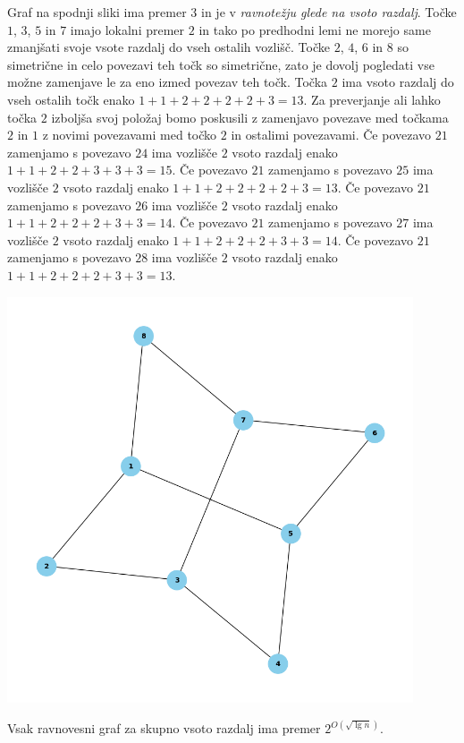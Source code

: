 \documentclass[fin1, tisk]{fmfdelo}
\begin{document}
\begin{dokaz}
Graf na spodnji sliki ima premer $3$ in je v \textit{ravnotežju glede na vsoto razdalj}.
Točke $1$, $3$, $5$ in $7$ imajo lokalni premer $2$ in tako po predhodni lemi ne
morejo same zmanjšati svoje vsote razdalj do vseh ostalih vozlišč. Točke $2$, $4$,
$6$ in $8$ so simetrične in celo povezavi teh točk so simetrične, zato je dovolj
pogledati vse možne zamenjave le za eno izmed povezav teh točk. Točka $2$ ima
vsoto razdalj do vseh ostalih točk enako $1 + 1 + 2 + 2 + 2 + 2 + 3 = 13$. Za
preverjanje ali lahko točka $2$ izboljša svoj položaj bomo poskusili z zamenjavo
povezave med točkama $2$ in $1$ z novimi povezavami med točko $2$ in ostalimi povezavami.
Če povezavo $21$ zamenjamo s povezavo $24$ ima vozlišče $2$ vsoto razdalj enako
$1 + 1 + 2 + 2 + 3 + 3 + 3 = 15$. Če povezavo $21$ zamenjamo s povezavo $25$ ima
vozlišče $2$ vsoto razdalj enako $1 + 1 + 2 + 2 + 2 + 2 + 3 = 13$. Če povezavo $21$
zamenjamo s povezavo $26$ ima vozlišče $2$ vsoto razdalj enako
$1 + 1 + 2 + 2 + 2 + 3 + 3 = 14$. Če povezavo $21$ zamenjamo s povezavo $27$ ima
vozlišče $2$ vsoto razdalj enako $1 + 1 + 2 + 2 + 2 + 3 + 3 = 14$. Če povezavo $21$
zamenjamo s povezavo $28$ ima vozlišče $2$ vsoto razdalj enako
$1 + 1 + 2 + 2 + 2 + 3 + 3 = 13$.
\end{dokaz}

\includegraphics[width=0.9\textwidth]{vsota_premer_3.png}

\begin{izrek}
Vsak ravnovesni graf za skupno vsoto razdalj ima premer $2^{O(\sqrt{\lg n})}$.
\end{izrek}
\end{document}
